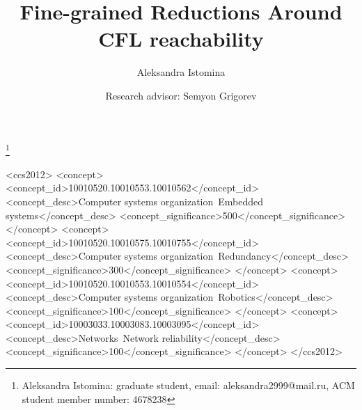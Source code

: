 \documentclass[acmsmall,nonacm]{acmart}
\begin{document}
	
	\title{Fine-grained Reductions Around CFL reachability}
	
	\author{Aleksandra Istomina}
	\thanks{Aleksandra Istomina: graduate student, email: aleksandra2999@mail.ru, ACM student member number: 4678238}
	
	\author{Research advisor: Semyon Grigorev}
	
	\newcommand\todo[1]{{\color{violet}#1}}
	\newcommand\db[1]{{\color{red}#1}}
	\newcommand\question[1]{{\color{cyan}#1}}
	
	
	
	
	\begin{CCSXML}
		<ccs2012>
		<concept>
		<concept_id>10010520.10010553.10010562</concept_id>
		<concept_desc>Computer systems organization~Embedded systems</concept_desc>
		<concept_significance>500</concept_significance>
		</concept>
		<concept>
		<concept_id>10010520.10010575.10010755</concept_id>
		<concept_desc>Computer systems organization~Redundancy</concept_desc>
		<concept_significance>300</concept_significance>
		</concept>
		<concept>
		<concept_id>10010520.10010553.10010554</concept_id>
		<concept_desc>Computer systems organization~Robotics</concept_desc>
		<concept_significance>100</concept_significance>
		</concept>
		<concept>
		<concept_id>10003033.10003083.10003095</concept_id>
		<concept_desc>Networks~Network reliability</concept_desc>
		<concept_significance>100</concept_significance>
		</concept>
		</ccs2012>
	\end{CCSXML}
	
\end{document}
